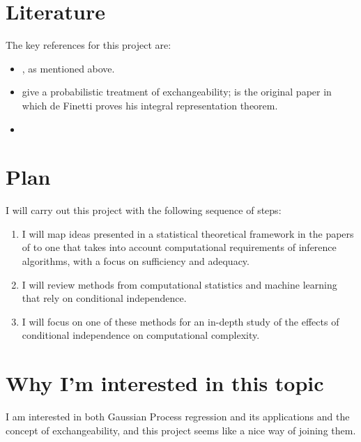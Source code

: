 \documentclass[]{STAT_547C}
\begin{document}
\section{Literature}

The key references for this project are:

\begin{itemize}
  \item \citet{McCullagh:2005:ExchAndReg}, as mentioned above.
  \item \cite{Kingman:1978, Bernardo:1996:Exch} give a probabilistic treatment of exchangeability; \cite{deFinetti:1930:RepTheorem} is the original paper in which de Finetti proves his integral representation theorem.
  \item 
\end{itemize}


\section{Plan}

I will carry out this project with the following sequence of steps: 
\begin{enumerate}
  \item I will map ideas presented in a statistical theoretical framework in the papers of \citet{Dawid:1979:CondIndStatTheory,Dawid:1980:CondIndStatOp} to one that takes into account computational requirements of  inference algorithms, with a focus on sufficiency and adequacy.
  \item I will review methods from computational statistics and machine learning that rely on conditional independence. 
  \item I will focus on one of these methods for an in-depth study of the effects of conditional independence on computational complexity.
\end{enumerate}


\section{Why I'm interested in this topic}

I am interested in both Gaussian Process regression and its applications and the concept of exchangeability, and this project seems like a nice way of joining them.


\printbibliography
\end{document}
